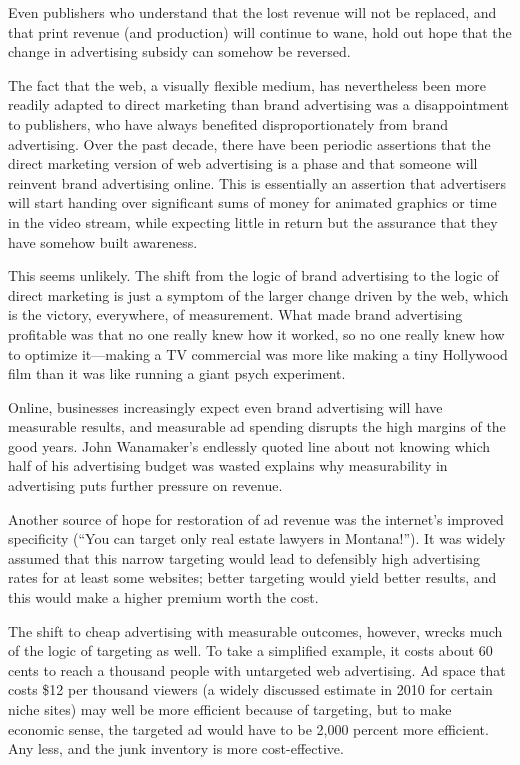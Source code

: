 Even publishers who understand that the lost revenue will not be replaced, and
that print revenue (and production) will continue to wane, hold out hope that
the change in advertising subsidy can somehow be reversed.

The fact that the web, a visually flexible medium, has nevertheless been more
readily adapted to direct marketing than brand advertising was a disappointment
to publishers, who have always benefited disproportionately from brand advertising.
Over the past decade, there have been periodic assertions that the direct
marketing version of web advertising is a phase and that someone will reinvent
brand advertising online. This is essentially an assertion that advertisers will start
handing over significant sums of money for animated graphics or time in the
video stream, while expecting little in return but the assurance that they have
somehow built awareness.

This seems unlikely. The shift from the logic of brand advertising to the logic of
direct marketing is just a symptom of the larger change driven by the web, which
is the victory, everywhere, of measurement. What made brand advertising profitable
was that no one really knew how it worked, so no one really knew how to
optimize it—making a TV commercial was more like making a tiny Hollywood
film than it was like running a giant psych experiment.

Online, businesses increasingly expect even brand advertising will have measurable
results, and measurable ad spending disrupts the high margins of the good
years. John Wanamaker’s endlessly quoted line about not knowing which half of
his advertising budget was wasted explains why measurability in advertising puts
further pressure on revenue.

Another source of hope for restoration of ad revenue was the internet’s improved
specificity (``You can target only real estate lawyers in Montana!''). It was widely
assumed that this narrow targeting would lead to defensibly high advertising rates
for at least some websites; better targeting would yield better results, and this
would make a higher premium worth the cost.

The shift to cheap advertising with measurable outcomes, however, wrecks much
of the logic of targeting as well. To take a simplified example, it costs about 60
cents to reach a thousand people with untargeted web advertising. Ad space that
costs \$12 per thousand viewers (a widely discussed estimate in 2010 for certain
niche sites) may well be more efficient because of targeting, but to make economic
sense, the targeted ad would have to be 2,000 percent more efficient. Any
less, and the junk inventory is more cost-effective.

